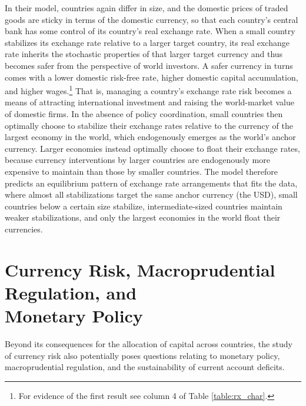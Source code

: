 \documentclass[11pt]{article}
\begin{document}
In their model, countries again differ in size, and the domestic prices of traded goods are sticky in terms of the domestic currency, so that each country's central bank has some control of its country's real exchange rate. When a small country stabilizes its exchange rate relative to a larger target country, its real exchange rate inherits the stochastic properties of that larger target currency and thus becomes safer from the perspective of world investors. A safer currency in turns comes with a lower domestic risk-free rate, higher domestic capital accumulation, and higher wages.\footnote{For evidence of the first result see column 4 of Table \ref{table:rx_char}.}  That is, managing a country's exchange rate risk becomes a means of attracting international investment and raising the world-market value of domestic firms. In the absence of policy coordination, small countries then optimally choose to stabilize their exchange rates relative to the currency of the largest economy in the world, which endogenously emerges as the world's anchor currency. Larger economies instead optimally choose to float their exchange rates, because currency interventions by larger countries are endogenously more expensive to maintain than those by smaller countries. The model therefore predicts an equilibrium pattern of exchange rate arrangements that fits the data, where almost all stabilizations target the same anchor currency (the USD), small countries below a certain size stabilize, intermediate-sized countries maintain weaker stabilizations, and only the largest economies in the world float their currencies. 

\section{Currency Risk, Macroprudential Regulation, and \\ 
Monetary Policy \label{sec_balancesheets}}

Beyond its consequences for the allocation of capital across countries, the study of currency risk also potentially poses questions relating to monetary policy, macroprudential regulation, and the sustainability of current account deficits.
\end{document}
